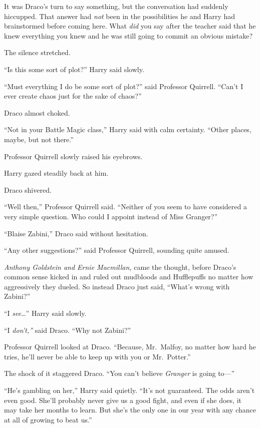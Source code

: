 It was Draco's turn to say something, but the conversation had suddenly
hiccupped. That answer had \emph{not} been in the possibilities he and
Harry had brainstormed before coming here. What \emph{did} you say after
the teacher said that he knew everything you knew and he was still going
to commit an obvious mistake?

The silence stretched.

``Is this some sort of plot?'' Harry said slowly.

``Must everything I do be some sort of plot?'' said Professor Quirrell.
``Can't I ever create chaos just for the sake of chaos?''

Draco almost choked.

``Not in your Battle Magic class,'' Harry said with calm certainty.
``Other places, maybe, but not there.''

Professor Quirrell slowly raised his eyebrows.

Harry gazed steadily back at him.

Draco shivered.

``Well then,'' Professor Quirrell said. ``Neither of you seem to have
considered a very simple question. Who could I appoint instead of Miss
Granger?''

``Blaise Zabini,'' Draco said without hesitation.

``Any other suggestions?'' said Professor Quirrell, sounding quite
amused.

\emph{Anthony Goldstein and Ernie Macmillan,} came the thought, before
Draco's common sense kicked in and ruled out mudbloods and Hufflepuffs
no matter how aggressively they dueled. So instead Draco just said,
``What's wrong with Zabini?''

``I \emph{see}\ldots{}'' Harry said slowly.

``I \emph{don't,''} said Draco. ``Why not Zabini?''

Professor Quirrell looked at Draco. ``Because, Mr.~Malfoy, no matter how
hard he tries, he'll never be able to keep up with you or Mr.~Potter.''

The shock of it staggered Draco. ``You can't believe \emph{Granger} is
going to---''

``He's gambling on her,'' Harry said quietly. ``It's not guaranteed. The
odds aren't even good. She'll probably never give us a good fight, and
even if she does, it may take her months to learn. But she's the only
one in our year with any chance at all of growing to beat us.''

